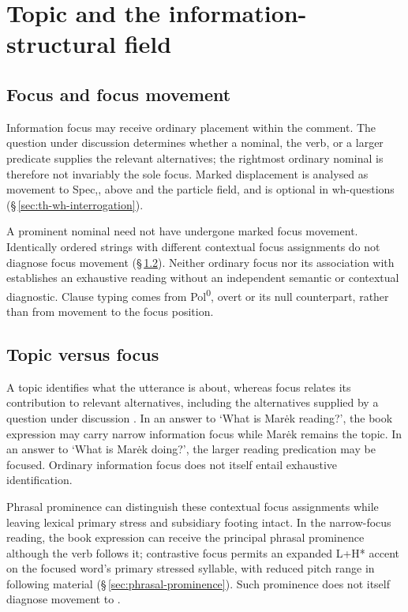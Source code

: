 \section{Topic and the information-structural field}\label{sec:tc-isf}
\subsection{Focus and focus movement}
\label{sec:th-focus}

Information focus may receive ordinary placement within the comment. The question under
 discussion determines whether a nominal, the verb, or a larger predicate
 supplies the relevant alternatives; the rightmost ordinary nominal is
 therefore not invariably the sole focus. Marked displacement is analysed as
 movement to Spec,, above  and the particle field, and is
 optional in wh-questions (§\,\ref{sec:th-wh-interrogation}).

A prominent nominal need not have undergone marked focus movement.
 Identically ordered strings with different contextual focus assignments do not
 diagnose focus movement (§\,\ref{sec:tc-focus-contrast}). Neither ordinary focus nor
 its association with  establishes an exhaustive reading without
 an independent semantic or contextual diagnostic. Clause typing comes from
 Pol\textsuperscript{0}, overt  or its null counterpart, rather than
 from movement to the focus position.

\subsection{Topic versus focus}\label{sec:tc-focus-contrast}

A topic identifies what the utterance is about, whereas focus relates its
 contribution to relevant alternatives, including the alternatives supplied by
 a question under discussion \cite[§§\,3.1, 3.4]{krifka2008}. In an answer to
 `What is Marėk reading?', the book expression may carry narrow information
 focus while Marėk remains the topic. In an answer to `What is Marėk doing?',
 the larger reading predication may be focused. Ordinary information focus
 does not itself entail exhaustive identification.

Phrasal prominence can distinguish these contextual focus assignments while
 leaving lexical primary stress and subsidiary footing intact. In the
 narrow-focus reading, the book expression can receive the principal phrasal
 prominence although the verb follows it; contrastive focus permits an expanded
 L+H* accent on the focused word's primary stressed syllable, with reduced pitch
 range in following material (§\,\ref{sec:phrasal-prominence}). Such prominence
 does not itself diagnose movement to .

